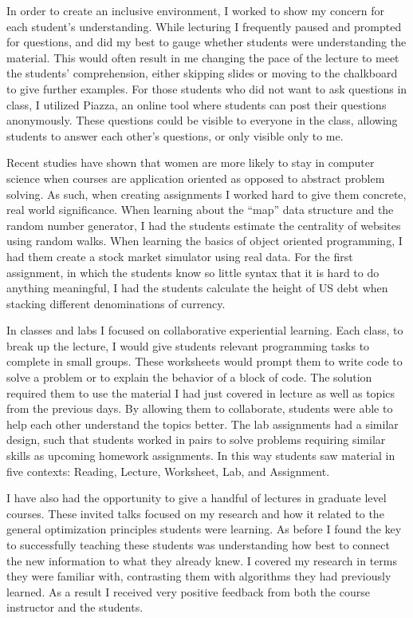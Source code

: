 \documentclass[a4paper, 11pt]{article}
\begin{document}
In order to create an inclusive environment, I worked to
show my concern for each student's understanding. While
lecturing I frequently paused and prompted for questions,
and did my best to gauge whether students were understanding
the material. This would often result in me changing the pace
of the lecture to meet the students' comprehension, either
skipping slides or moving to the chalkboard to give further
examples. For those students who did not want to ask questions
in class, I utilized Piazza, an online tool where students
can post their questions anonymously. These questions could be
visible to everyone in the class, allowing students to answer
each other's questions, or only visible only to me.

Recent studies have shown that women are more likely to stay
in computer science when courses are application oriented
as opposed to abstract problem solving. As such, when creating
assignments I worked hard to give them concrete,
real world significance. When learning about the ``map'' data
structure and the random number generator, I had the students
estimate the centrality of websites using random walks.
When learning the basics of object oriented programming,
I had them create a stock market simulator using real data.
For the first assignment, in which the students know so little
syntax that it is hard to do anything meaningful, I had the
students calculate the height of US debt when stacking different denominations of currency.

In classes and labs I focused on collaborative experiential learning.
Each class, to break up the lecture, I would give students
relevant programming tasks to complete in small groups.
These worksheets would prompt them to write code to solve a
problem or to explain the behavior of a block of code. The solution
required them to use the material I had just covered in lecture as
well as topics from the previous days. By allowing them to collaborate,
students were able to help each other understand the topics better.
The lab assignments had a similar design, such that students worked
in pairs to solve problems requiring similar skills as upcoming
homework assignments. In this way students saw material in five
contexts: Reading, Lecture, Worksheet, Lab, and Assignment.

I have also had the opportunity to give a handful of lectures in graduate level courses.
These invited talks focused on my research and how it related
to the general optimization principles students were learning.
As before I found the key to successfully teaching these students
was understanding how best to connect the new information to
what they already knew. I covered my research in terms they
were familiar with, contrasting them with algorithms they had
previously learned. As a result I received very positive
feedback from both the course instructor and the students.
\end{document}
